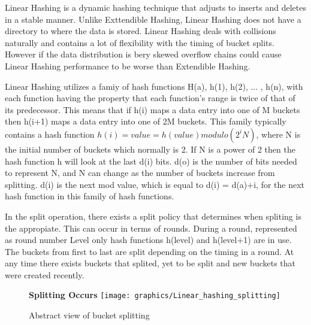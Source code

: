 \documentclass[letterpaper, 12pt]{article}
\begin{document}
Linear Hashing is a dynamic hashing technique that adjusts to inserts and deletes in a stable manner.
Unlike Exttendible Hashing, Linear Hashing does not have a directory to where the data is
stored. Linear Hashing deals with collisions naturally and contains a lot of flexibility with
the timing of bucket splits. However if the data distribution is bery skewed overflow chains could cause Linear Hashing performance to be
worse than Extendible Hashing.
\par\vspace{\baselineskip}
Linear Hashing utilizes a famiy of hash functions H(a), h(1), h(2), ... , h(n), with each function having the property that each function's range is twice of that of its predecessor. This means that if h(i) maps a data entry into one of M buckets then h(i+1) maps a data entry into one of 2M buckets. This family typically contains a hash function $ h(i) = value = h(value) modulo (2^i N) $, where N is the initial number of buckets which normally is 2. If N is a power of 2 then the hash function h will look at the last d(i) bits. d(o) is the number of bits needed to represent N, and N can change as the number of buckets increase from splitting. d(i) is the next mod value, which is equal to d(i) = d(a)+i, for the next hash function in this family of hash functions.
\par\vspace{\baselineskip}
In the split operation, there exists a split policy that determines when spliting is the appropiate. This can occur in terms of rounds. During a round, represented as round number Level only hash functions h(level) and h(level+1) are in use. The buckets from first to last are split depending on the timing in a round. At any time there exists buckets that splited, yet to be split and new buckets that were created recently.
\par\vspace{\baselineskip}
\begin{figure}
  \centering
  \textbf{Splitting Occurs}
  \texttt{[image: graphics/Linear\_hashing\_splitting]}
  \cite{ramakrishnan2000database}
  \caption{Abstract view of bucket splitting}
\end{figure}
\end{document}
